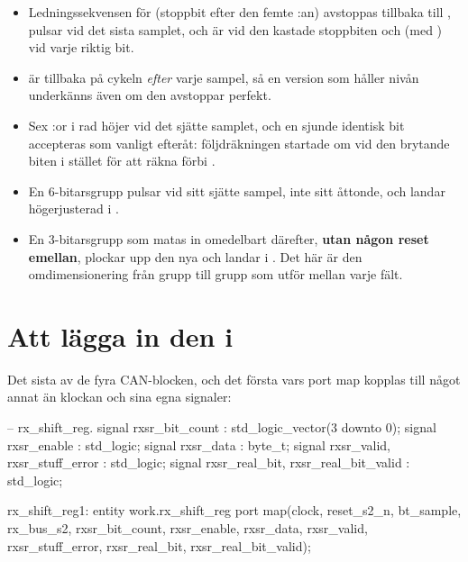 \begin{itemize}
  \item Ledningssekvensen för  (stoppbit efter den femte :an) avstoppas
    tillbaka till ,  pulsar vid det sista samplet, och
     är  vid den kastade stoppbiten och  (med
    ) vid varje riktig bit.
  \item {} är tillbaka på  cykeln \emph{efter} varje sampel, så en
    version som håller nivån underkänns även om den avstoppar perfekt.
  \item Sex :or i rad höjer  vid det sjätte samplet, och en sjunde
    identisk bit accepteras som vanligt efteråt: följdräkningen startade om vid den brytande biten i
    stället för att räkna förbi .
  \item En 6-bitarsgrupp pulsar  vid sitt sjätte sampel, inte sitt åttonde, och landar
    högerjusterad i .
  \item En 3-bitarsgrupp som matas in omedelbart därefter, \textbf{utan någon reset emellan}, plockar
    upp den nya  och landar i . Det här är den omdimensionering
    från grupp till grupp som  utför mellan varje fält.
\end{itemize}

\section{Att lägga in den i }
\label{c15:sec:wire}

Det sista av de fyra CAN-blocken, och det första vars port map kopplas till något annat än klockan
och sina egna signaler:

\begin{vhdlcode}
    -- rx_shift_reg.
    signal rxsr_bit_count                     : std_logic_vector(3 downto 0);
    signal rxsr_enable                        : std_logic;
    signal rxsr_data                          : byte_t;
    signal rxsr_valid,    rxsr_stuff_error    : std_logic;
    signal rxsr_real_bit, rxsr_real_bit_valid : std_logic;
\end{vhdlcode}

\begin{vhdlcode}
    rx_shift_reg1: entity work.rx_shift_reg
        port map(clock, reset_s2_n, bt_sample, rx_bus_s2, rxsr_bit_count, rxsr_enable,
                 rxsr_data, rxsr_valid, rxsr_stuff_error, rxsr_real_bit, rxsr_real_bit_valid);
\end{vhdlcode}

